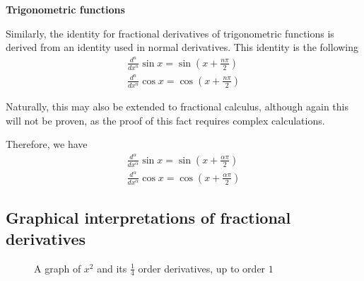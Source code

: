 \documentclass{article}
\begin{document}
\textbf{Trigonometric functions}

Similarly, the identity for fractional derivatives of trigonometric functions
is derived from an identity used in normal derivatives. This identity is the
following
\begin{gather*}
\frac{d^n}{dx^n} \sin{x} = \sin\left(x + \frac{n\pi}{2}\right) \\
\frac{d^n}{dx^n} \cos{x} = \cos\left(x + \frac{n\pi}{2}\right)
\end{gather*}

Naturally, this may also be extended to fractional calculus, although again
this will not be proven, as the proof of this fact requires complex
calculations.

Therefore, we have
\begin{gather*}
\frac{d^\alpha}{dx^\alpha} \sin{x} = \sin\left(x + \frac{\alpha\pi}{2}\right) \\
\frac{d^\alpha}{dx^\alpha} \cos{x} = \cos\left(x + \frac{\alpha\pi}{2}\right)
\end{gather*}

\subsection{Graphical interpretations of fractional derivatives}

\begin{figure}[H]
\def\figonexmax{15}
\centering
{}
\caption{A graph of $x^2$ and its $\frac{1}{4}$ order derivatives, up to order $1$} \label{xsquaredgraph}
\end{figure}
\end{document}
